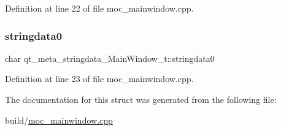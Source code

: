 Definition at line 22 of file moc\+\_\+mainwindow.\+cpp.

\mbox{\label{structqt__meta__stringdata___main_window__t_a17b51b6af12b7f5ebb4f7b55545039db}} 
\subsubsection{\texorpdfstring{stringdata0}{stringdata0}}
{\footnotesize\ttfamily char qt\+\_\+meta\+\_\+stringdata\+\_\+\+Main\+Window\+\_\+t\+::stringdata0}



Definition at line 23 of file moc\+\_\+mainwindow.\+cpp.



The documentation for this struct was generated from the following file\+:\begin{DoxyCompactItemize}
\item 
build/\mbox{\hyperlink{build_2moc__mainwindow_8cpp}{moc\+\_\+mainwindow.\+cpp}}\end{DoxyCompactItemize}
